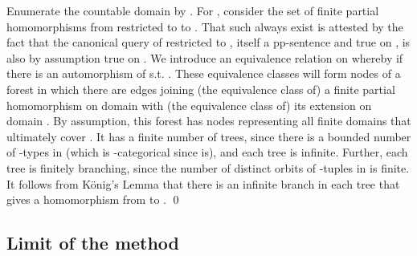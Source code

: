 \documentclass{LMCS}
\begin{document}
Enumerate the countable domain  by . For , consider the set  of finite partial homomorphisms from  restricted to  to . That such always exist is attested by the fact that the canonical query of restricted to , itself a pp-sentence and true on  , is also by assumption true on . We introduce an equivalence relation on  whereby  if there is an automorphism  of  s.t. . These equivalence classes will form nodes of a forest in which there are edges joining (the equivalence class of) a finite partial homomorphism  on domain  with (the equivalence class of) its extension on domain . By assumption, this forest has nodes representing all finite domains that ultimately cover . It has a  finite number of trees, since there is a bounded number of -types in  (which is -categorical since  is), and each tree is infinite. Further, each tree is finitely branching, since the number of distinct orbits of -tuples in  is finite. It follows from K\"onig's Lemma that there is an infinite branch in each tree that gives a homomorphism from  to .
\qed


\subsection{Limit of the method}
\label{sec:limit}
\end{document}
